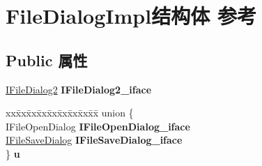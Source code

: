\hypertarget{struct_file_dialog_impl}{}\section{File\+Dialog\+Impl结构体 参考}
\label{struct_file_dialog_impl}
\subsection*{Public 属性}
\begin{DoxyCompactItemize}
\item 
\mbox{\label{struct_file_dialog_impl_a8f0c73bc5a84969dc1a0b5ae9766b5cd}} 
\hyperlink{interface_i_file_dialog2}{I\+File\+Dialog2} {\bfseries I\+File\+Dialog2\+\_\+iface}
\item 
\mbox{\label{struct_file_dialog_impl_a958df98bb8b8e6cd20b05ab82c0d4c70}} 
\begin{tabbing}
xx\=xx\=xx\=xx\=xx\=xx\=xx\=xx\=xx\=\kill
union \{\\
\>IFileOpenDialog {\bfseries IFileOpenDialog\_iface}\\
\>\hyperlink{interface_i_file_save_dialog}{IFileSaveDialog} {\bfseries IFileSaveDialog\_iface}\\
\} {\bfseries u}\\


\end{tabbing}
\end{DoxyCompactItemize}

